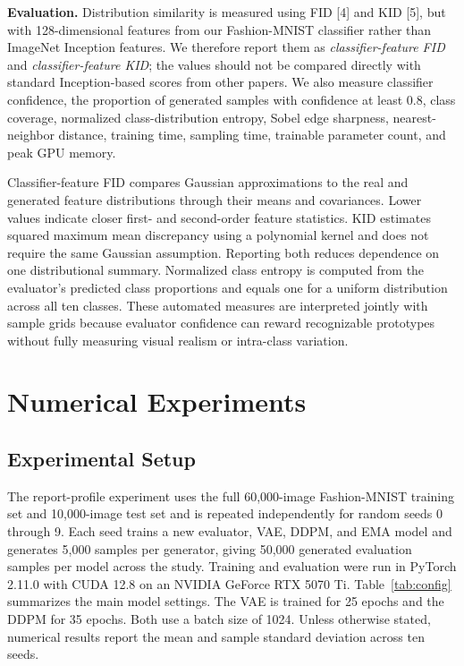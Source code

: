\documentclass{article}
\begin{document}
\textbf{Evaluation.} Distribution similarity is measured using FID [4] and KID [5], but with 128-dimensional features from our Fashion-MNIST classifier rather than ImageNet Inception features. We therefore report them as \emph{classifier-feature FID} and \emph{classifier-feature KID}; the values should not be compared directly with standard Inception-based scores from other papers. We also measure classifier confidence, the proportion of generated samples with confidence at least 0.8, class coverage, normalized class-distribution entropy, Sobel edge sharpness, nearest-neighbor distance, training time, sampling time, trainable parameter count, and peak GPU memory.

Classifier-feature FID compares Gaussian approximations to the real and generated feature distributions through their means and covariances. Lower values indicate closer first- and second-order feature statistics. KID estimates squared maximum mean discrepancy using a polynomial kernel and does not require the same Gaussian assumption. Reporting both reduces dependence on one distributional summary. Normalized class entropy is computed from the evaluator's predicted class proportions and equals one for a uniform distribution across all ten classes. These automated measures are interpreted jointly with sample grids because evaluator confidence can reward recognizable prototypes without fully measuring visual realism or intra-class variation.

\section{Numerical Experiments}
\subsection{Experimental Setup}
The report-profile experiment uses the full 60,000-image Fashion-MNIST training set and 10,000-image test set and is repeated independently for random seeds 0 through 9. Each seed trains a new evaluator, VAE, DDPM, and EMA model and generates 5,000 samples per generator, giving 50,000 generated evaluation samples per model across the study. Training and evaluation were run in PyTorch 2.11.0 with CUDA 12.8 on an NVIDIA GeForce RTX 5070 Ti. Table~\ref{tab:config} summarizes the main model settings. The VAE is trained for 25 epochs and the DDPM for 35 epochs. Both use a batch size of 1024. Unless otherwise stated, numerical results report the mean and sample standard deviation across ten seeds.
\end{document}
